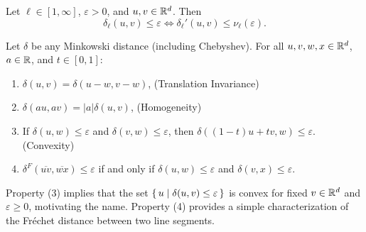 \begin{observation}\label{obs:unnormalize}
  Let \(\ell \in [1, \infty]\), \(\varepsilon > 0\), and \(u, v \in \mathbb{R}^d\). Then
    \[\delta_\ell(u, v) \leq \varepsilon \iff \delta_\ell'(u, v) \leq \nu_\ell(\varepsilon).\]
\end{observation}

\begin{lemma}\label{lem:distance_properties}
	Let \(\delta\) be any Minkowski distance (including Chebyshev). For all \(u, v, w, x \in \mathbb{R}^d\), \(a \in \mathbb{R}\), and \(t \in [0, 1]\):
  \begin{enumerate}
		\item \(\delta(u, v) = \delta(u - w, v - w)\), \hfill (Translation Invariance)
		\item \(\delta(a u, a v) = |a| \delta(u, v)\), \hfill (Homogeneity)
		\item If \(\delta(u, w) \leq \varepsilon\) and \(\delta(v, w) \leq \varepsilon\), then \(\delta((1-t)u + tv, w) \leq \varepsilon\). \hfill (Convexity)
		\item \(\delta^F(\overline{uv}, \overline{wx}) \leq \varepsilon\) if and only if \(\delta(u, w) \leq \varepsilon\) and \(\delta(v, x) \leq \varepsilon\).
	\end{enumerate}
\end{lemma}

Property (3) implies that the set \(\set{u \mid \delta(u, v) \leq \varepsilon }\) is convex for fixed \(v \in \mathbb{R}^d\) and \(\varepsilon \geq 0\), motivating the name. Property (4) provides a simple characterization of the Fréchet distance between two line segments.

